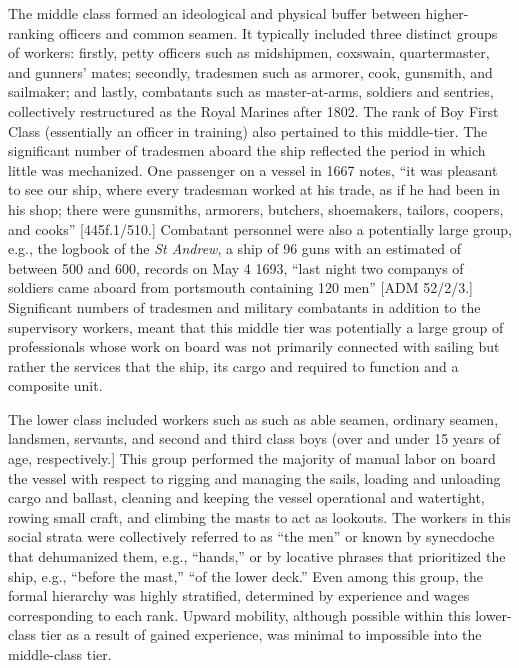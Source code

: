The middle class formed an ideological and physical buffer between higher-ranking officers and common seamen. It typically included three distinct groups of workers: firstly, petty officers such as midshipmen, coxswain, quartermaster, and gunners’ mates; secondly, tradesmen such as armorer, cook, gunsmith, and sailmaker; and lastly, combatants such as master-at-arms, soldiers and sentries, collectively restructured as the Royal Marines after 1802. The rank of Boy First Class (essentially an officer in training) also pertained to this middle-tier.  The significant number of tradesmen aboard the ship reflected the period in which little was mechanized. One passenger on a  vessel in 1667 notes, “it was pleasant to see our ship, where every tradesman worked at his trade, as if he had been in his shop; there were gunsmiths, armorers, butchers, shoemakers, tailors, coopers, and cooks” [445f.1/510.] Combatant personnel were also a potentially large group, e.g., the logbook of the \textit{St Andrew}, a ship of 96 guns with an estimated  of between 500 and 600, records on May 4 1693, “last night two companys of soldiers came aboard from portsmouth containing 120 men” [ADM 52/2/3.] Significant numbers of tradesmen and military combatants in addition to the supervisory workers, meant that this middle tier was potentially a large group of professionals whose work on board was not primarily connected with sailing but rather the services that the ship, its cargo and  required to function and a composite unit.

The lower class included workers such as such as able seamen, ordinary seamen, landsmen, servants, and second and third class boys (over and under 15 years of age, respectively.] This group performed the majority of manual labor on board the vessel with respect to rigging and managing the sails, loading and unloading cargo and ballast, cleaning and keeping the vessel operational and watertight, rowing small craft, and climbing the masts to act as lookouts. The workers in this social strata were collectively referred to as “the men” or known by synecdoche that dehumanized them, e.g., “hands,” or by locative phrases that prioritized the ship, e.g., “before the mast,” “of the lower deck.” Even among this group, the formal hierarchy was highly stratified, determined by experience and wages corresponding to each rank. Upward mobility, although possible within this lower-class tier as a result of gained experience, was minimal to impossible into the middle-class tier. 

